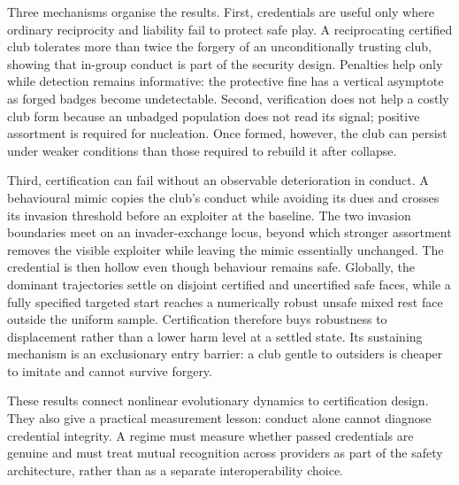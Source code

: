 Three mechanisms organise the results. First, credentials are useful only
where ordinary reciprocity and liability fail to protect safe play. A
reciprocating certified club tolerates more than twice the forgery of an
unconditionally trusting club, showing that in-group conduct is part of the
security design. Penalties help only while detection remains informative: the
protective fine has a vertical asymptote as forged badges become
undetectable. Second, verification does not help a costly club form because an
unbadged population does not read its signal; positive assortment is required
for nucleation. Once formed, however, the club can persist under weaker
conditions than those required to rebuild it after collapse.

Third, certification can fail without an observable deterioration in conduct.
A behavioural mimic copies the club's conduct while avoiding its dues and
crosses its invasion threshold before an exploiter at the baseline. The two
invasion boundaries meet on an invader-exchange locus, beyond which stronger
assortment removes the visible exploiter while leaving the mimic essentially
unchanged. The credential is then hollow even though behaviour remains safe.
Globally, the dominant trajectories settle on disjoint certified and
uncertified safe faces, while a fully specified targeted start reaches a
numerically robust unsafe mixed rest face outside the uniform sample. Certification
therefore buys robustness to displacement rather than a lower harm level at a
settled state. Its sustaining mechanism is an exclusionary entry barrier: a
club gentle to outsiders is cheaper to imitate and cannot survive forgery.

These results connect nonlinear evolutionary dynamics to certification design.
They also give a practical measurement lesson: conduct alone cannot diagnose
credential integrity. A regime must measure whether passed credentials are
genuine and must treat mutual recognition across providers as part of the
safety architecture, rather than as a separate interoperability choice.
